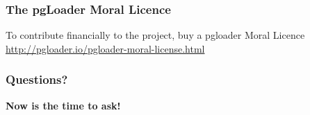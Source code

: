 \documentclass[xcolor=dvipsnames]{beamer}
\begin{document}
{
  \begin{frame}
    \frametitle{The pgLoader Moral Licence}

    \begin{Large}
      \begin{center}
        To contribute financially to the project, buy a
        \vfill
        pgloader Moral Licence
        \vfill
        \url{http://pgloader.io/pgloader-moral-license.html}
      \end{center}
    \end{Large}
    \vfill
  \end{frame}
}

{
 
  \begin{frame}
    \frametitle{Questions?}

    \begin{center}
      \textbf{\Large Now is the time to ask!}
    \end{center}
  \end{frame}
}
\end{document}
